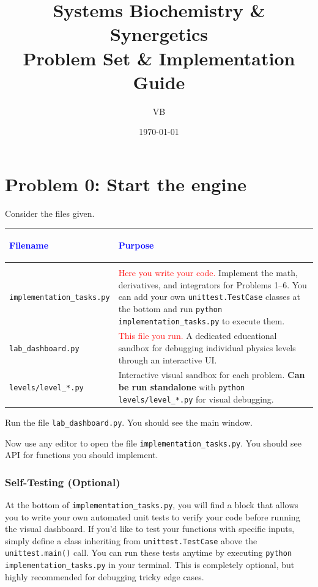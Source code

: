 \documentclass[11pt]{article}
\title{Systems Biochemistry \& Synergetics \\ \large Problem Set \& Implementation Guide}
\author{VB}
\date{\today}
\begin{document}
\maketitle

\section*{Problem 0: Start the engine}

Consider the files given.
\begin{center}
\renewcommand{\arraystretch}{1.5}
\begin{tabularx}{\textwidth}{@{} >{%
\bfseries\raggedright\arraybackslash}p{5.5cm} X @{}}
\toprule
\textcolor{blue}{Filename} & \textcolor{blue}{Purpose} \\ \midrule
\multicolumn{2}{@{}l}{\textbf{Direct Interaction}} \\ \midrule
\lstinline|implementation_tasks.py| & \textcolor{red}{Here you write your code.} Implement the math, derivatives, and integrators for Problems 1--6. You can add your own \lstinline|unittest.TestCase| classes at the bottom and run \lstinline|python implementation_tasks.py| to execute them. \\
\lstinline|lab_dashboard.py| & \textcolor{red}{This file you run.} A dedicated educational sandbox for debugging individual physics levels through an interactive UI. \\
\lstinline|levels/level_*.py| & Interactive visual sandbox for each problem. \textbf{Can be run standalone} with \lstinline|python levels/level_*.py| for visual debugging. \\
\bottomrule
\end{tabularx}
\end{center}

Run the file \lstinline|lab_dashboard.py|. You should see the main window.

Now use any editor to open the file \lstinline|implementation_tasks.py|. You should see API for functions you should implement.

\subsubsection*{Self-Testing (Optional)}
At the bottom of \lstinline|implementation_tasks.py|, you will find a block that allows you to write your own automated unit tests to verify your code before running the visual dashboard. If you'd like to test your functions with specific inputs, simply define a class inheriting from \lstinline|unittest.TestCase| above the \lstinline|unittest.main()| call. You can run these tests anytime by executing \lstinline|python implementation_tasks.py| in your terminal. This is completely optional, but highly recommended for debugging tricky edge cases.
\end{document}
